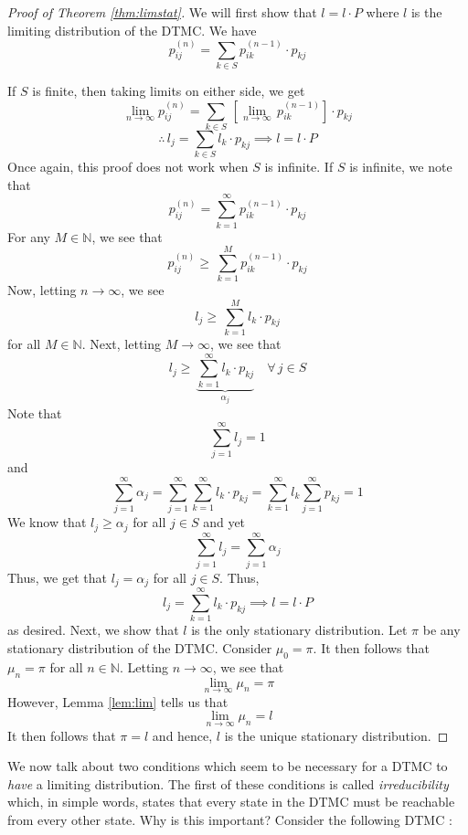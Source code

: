 \documentclass[12pt]{article}
\theoremstyle{definition}
\begin{document}
\begin{proof}[Proof of Theorem \ref{thm:limstat}]
    We will first show that $l = l \cdot P$ where $l$ is the limiting distribution of the DTMC. We have
    \[
        p_{ij}^{(n)} = \sum_{k \in S} p_{ik}^{(n-1)} \cdot p_{kj}
    \]
    
    If $S$ is finite, then taking limits on either side, we get
    \[
        \lim_{n \to \infty} p_{ij}^{(n)} = \sum_{k \in S} \, \left[ \lim_{n \to \infty} \, p_{ik}^{(n-1)} \right] \cdot p_{kj}
    \] 
    \[
        \therefore \, l_j = \sum_{k \in S} l_k \cdot p_{kj} \implies l = l \cdot P
    \]
    Once again, this proof does not work when $S$ is infinite. If $S$ is infinite, we note that
    \[
        p_{ij}^{(n)} = \sum_{k=1}^{\infty} p_{ik}^{(n-1)} \cdot p_{kj}
    \]
    For any $M \in \mathbb{N}$, we see that
    \[
        p_{ij}^{(n)} \geq \, \sum_{k=1}^{M} p_{ik}^{(n-1)} \cdot p_{kj}
    \]
    Now, letting $n \to \infty$, we see
    \[
        l_j \geq \, \sum_{k=1}^{M} l_{k} \cdot p_{kj}
    \]
    for all $M \in \mathbb{N}$. Next, letting $M \to \infty$, we see that
    \[
        l_j \geq \, \underbrace{\sum_{k=1}^{\infty} l_k \cdot p_{kj}}_{\alpha_j} \quad \forall \, j \in S
    \]  
    Note that 
    \[
        \sum_{j =1}^{\infty} l_j = 1
    \]  
    and
    \[
        \sum_{j=1}^{\infty} \alpha_j = \sum_{j=1}^{\infty} \sum_{k=1}^{\infty} l_k \cdot p_{kj} = \sum_{k=1}^{\infty} l_k \sum_{j=1}^{\infty} p_{kj} = 1
    \]
    We know that $l_j \geq \alpha_j$ for all $j \in S$ and yet
    \[
        \sum_{j=1}^{\infty} l_j = \sum_{j=1}^{\infty} \alpha_j 
    \]
    Thus, we get that $l_j = \alpha_j$ for all $j \in S$. Thus, 
    \[
        l_j = \sum_{k=1}^{\infty} l_k \cdot p_{kj} \implies l = l \cdot P
    \]
    as desired. Next, we show that $l$ is the only stationary distribution. Let $\pi$ be any stationary distribution of the DTMC. Consider $\mu_0 = \pi$. It then follows that $\mu_n = \pi$ for all $n \in \mathbb{N}$. Letting $n \to \infty$, we see that
    \[
        \lim_{n \to \infty} \mu_n = \pi
    \]
    However, Lemma \ref{lem:lim} tells us that
    \[
        \lim_{n \to \infty} \mu_n = l
    \]
    It then follows that $\pi = l$ and hence, $l$ is the unique stationary distribution.
\end{proof}

\newpage

We now talk about two conditions which seem to be necessary for a DTMC to \emph{have} a limiting distribution. The first of these conditions is called \emph{irreducibility} which, in simple words, states that every state in the DTMC must be reachable from every other state. Why is this important? Consider the following DTMC :
\end{document}
